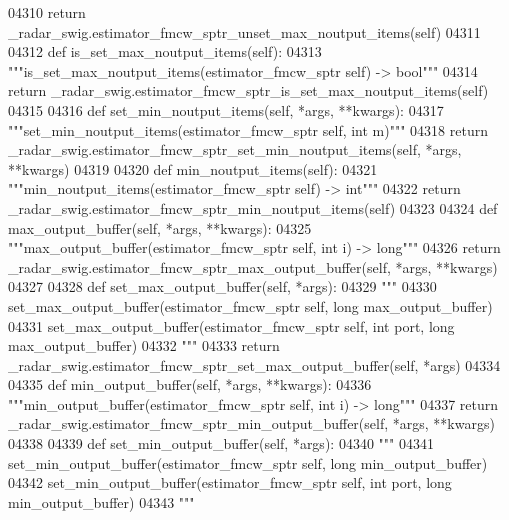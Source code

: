 \begin{DoxyCode}
{{{{{{{{{{{{{{{04310         \textcolor{keywordflow}{return} \_radar\_swig.estimator\_fmcw\_sptr\_unset\_max\_noutput\_items(self)
04311 
04312     \textcolor{keyword}{def }is_set_max_noutput_items(self):
04313         \textcolor{stringliteral}{"""is\_set\_max\_noutput\_items(estimator\_fmcw\_sptr self) -> bool"""}
04314         \textcolor{keywordflow}{return} \_radar\_swig.estimator\_fmcw\_sptr\_is\_set\_max\_noutput\_items(self)
04315 
04316     \textcolor{keyword}{def }set_min_noutput_items(self, *args, **kwargs):
04317         \textcolor{stringliteral}{"""set\_min\_noutput\_items(estimator\_fmcw\_sptr self, int m)"""}
04318         \textcolor{keywordflow}{return} \_radar\_swig.estimator\_fmcw\_sptr\_set\_min\_noutput\_items(self, *args, **kwargs)
04319 
04320     \textcolor{keyword}{def }min_noutput_items(self):
04321         \textcolor{stringliteral}{"""min\_noutput\_items(estimator\_fmcw\_sptr self) -> int"""}
04322         \textcolor{keywordflow}{return} \_radar\_swig.estimator\_fmcw\_sptr\_min\_noutput\_items(self)
04323 
04324     \textcolor{keyword}{def }max_output_buffer(self, *args, **kwargs):
04325         \textcolor{stringliteral}{"""max\_output\_buffer(estimator\_fmcw\_sptr self, int i) -> long"""}
04326         \textcolor{keywordflow}{return} \_radar\_swig.estimator\_fmcw\_sptr\_max\_output\_buffer(self, *args, **kwargs)
04327 
04328     \textcolor{keyword}{def }set_max_output_buffer(self, *args):
04329         \textcolor{stringliteral}{"""}
04330 \textcolor{stringliteral}{        set\_max\_output\_buffer(estimator\_fmcw\_sptr self, long max\_output\_buffer)}
04331 \textcolor{stringliteral}{        set\_max\_output\_buffer(estimator\_fmcw\_sptr self, int port, long max\_output\_buffer)}
04332 \textcolor{stringliteral}{        """}
04333         \textcolor{keywordflow}{return} \_radar\_swig.estimator\_fmcw\_sptr\_set\_max\_output\_buffer(self, *args)
04334 
04335     \textcolor{keyword}{def }min_output_buffer(self, *args, **kwargs):
04336         \textcolor{stringliteral}{"""min\_output\_buffer(estimator\_fmcw\_sptr self, int i) -> long"""}
04337         \textcolor{keywordflow}{return} \_radar\_swig.estimator\_fmcw\_sptr\_min\_output\_buffer(self, *args, **kwargs)
04338 
04339     \textcolor{keyword}{def }set_min_output_buffer(self, *args):
04340         \textcolor{stringliteral}{"""}
04341 \textcolor{stringliteral}{        set\_min\_output\_buffer(estimator\_fmcw\_sptr self, long min\_output\_buffer)}
04342 \textcolor{stringliteral}{        set\_min\_output\_buffer(estimator\_fmcw\_sptr self, int port, long min\_output\_buffer)}
04343 \textcolor{stringliteral}{        """}
}}}}}}}}}}}}}}}
\end{DoxyCode}
